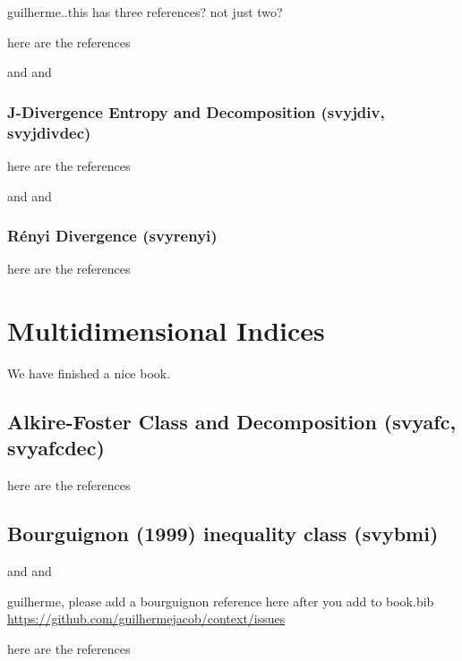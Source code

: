 \documentclass[]{book}
\begin{document}
guilherme..this has three references? not just two?

here are the references

\citep{langel2012} and \citep{biewen2003} and \citep{shorrocks1984}

\subsection{J-Divergence Entropy and Decomposition (svyjdiv,
svyjdivdec)}\label{j-divergence-entropy-and-decomposition-svyjdiv-svyjdivdec}

here are the references

\citep{shorrocks1984} and \citep{rohde2016} and \citep{biewen2003}

\subsection{Rényi Divergence
(svyrenyi)}\label{renyi-divergence-svyrenyi}

here are the references

\citep{langel2012}

\chapter{Multidimensional Indices}\label{multidimensional}

We have finished a nice book.

\section{Alkire-Foster Class and Decomposition (svyafc,
svyafcdec)}\label{alkire-foster-class-and-decomposition-svyafc-svyafcdec}

here are the references

\section{Bourguignon (1999) inequality class
(svybmi)}\label{bourguignon-1999-inequality-class-svybmi}

\citep{alkire2011} and \citep{alkire2015} and \citep{pacifico2016}

guilherme, please add a bourguignon reference here after you add to
book.bib \url{https://github.com/guilhermejacob/context/issues}

here are the references

\citep{lugo2007}


\end{document}
